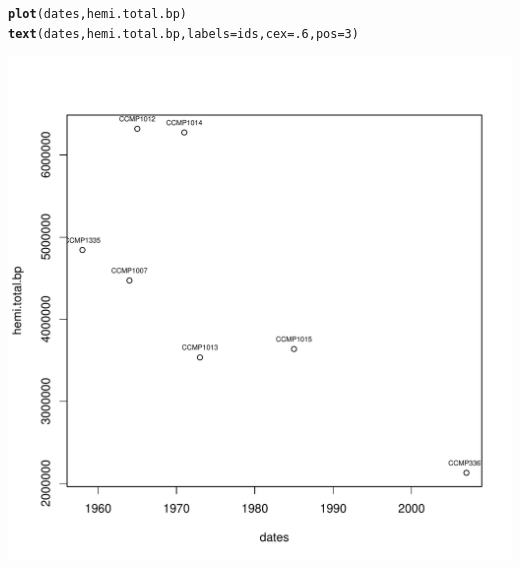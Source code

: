 \documentclass{article}\usepackage[]{graphicx}\usepackage[]{color}
\makeatletter
\def\maxwidth{ %
  \ifdim\Gin@nat@width>\linewidth
    \linewidth
  \else
    \Gin@nat@width
  \fi
}
\newcommand{\hlnum}[1]{\textcolor[rgb]{0.686,0.059,0.569}{#1}}%
\newcommand{\hlstd}[1]{\textcolor[rgb]{0.345,0.345,0.345}{#1}}%
\newcommand{\hlkwc}[1]{\textcolor[rgb]{0.333,0.667,0.333}{#1}}%
\newcommand{\hlkwd}[1]{\textcolor[rgb]{0.737,0.353,0.396}{\textbf{#1}}}%
\newenvironment{kframe}{%
 \def\at@end@of@kframe{}%
 \ifinner\ifhmode%
  \def\at@end@of@kframe{\end{minipage}}%
  \begin{minipage}{\columnwidth}%
 \fi\fi%
 \def\FrameCommand##1{\hskip\@totalleftmargin \hskip-\fboxsep
 \colorbox{shadecolor}{##1}\hskip-\fboxsep
     \hskip-\linewidth \hskip-\@totalleftmargin \hskip\columnwidth}%
 \MakeFramed {\advance\hsize-\width
   \@totalleftmargin\z@ \linewidth\hsize
   \@setminipage}}%
 {\par\unskip\endMakeFramed%
 \at@end@of@kframe}
\newenvironment{knitrout}{}{} %
\makeatother
\begin{document}
\begin{knitrout}\footnotesize
{}\color{fgcolor}\begin{kframe}
\begin{alltt}
\hlkwd{plot}\hlstd{(dates,hemi.total.bp)}
\hlkwd{text}\hlstd{(dates,hemi.total.bp,}\hlkwc{labels}\hlstd{=ids,}\hlkwc{cex}\hlstd{=}\hlnum{.6}\hlstd{,}\hlkwc{pos}\hlstd{=}\hlnum{3}\hlstd{)}
\end{alltt}
\end{kframe}

{\centering \includegraphics[width=\maxwidth]{figs-knitr/unnamed-chunk-61-1} 

}



\end{knitrout}
\end{document}

